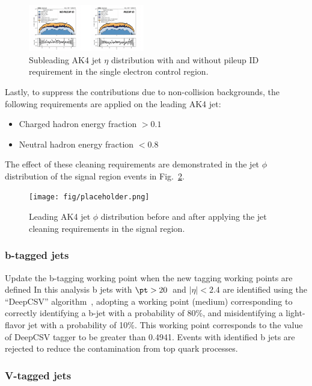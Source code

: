 \begin{figure}[htbp]
  \centering
        \includegraphics[width=0.45\textwidth]{fig/datamc/cr_1e_vbf/ak4_eta1_puidcomparison.png}
  \caption{Subleading AK4 jet $\eta$ distribution with and without pileup ID requirement in the single electron control region.}
  \label{fig:pileupid}
\end{figure}

Lastly, to suppress the contributions due to non-collision backgrounds, the following
requirements are applied on the leading AK4 jet:
\begin{itemize}
\item Charged hadron energy fraction $> 0.1$
\item Neutral hadron energy fraction $< 0.8$
\end{itemize}

The effect of these cleaning requirements are demonstrated in the jet $\phi$ distribution of
the signal region events in Fig.~\ref{fig:jetcleaning}.

\begin{figure}[htbp]
  \centering
        \texttt{[image: fig/placeholder.png]}
  \caption{Leading AK4 jet $\phi$ distribution before and after applying the jet cleaning
requirements in the signal region.}
  \label{fig:jetcleaning}
\end{figure}

\subsubsection{b-tagged jets}

{\color{red} Update the b-tagging working point when the new tagging working points are defined}
In this analysis b jets with $\pt > 20$~\GeV and $|\eta| < 2.4$ are identified
using the ``DeepCSV'' algorithm~\cite{Sirunyan:2017ezt},
adopting a working point (medium) corresponding to correctly identifying a b-jet with a
probability of 80\%, and misidentifying a light-flavor jet with a probability of 10\%.
This working point corresponds to the value of DeepCSV tagger to be greater than 0.4941.
Events with identified b jets are rejected to reduce the contamination from top quark processes.

\subsubsection{V-tagged jets}

